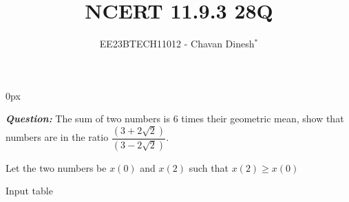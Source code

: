 \documentclass[journal,12pt,twocolumn]{IEEEtran}
\theoremstyle{remark}
\begin{document}
\parindent 0px

\vspace{3cm}

\title{NCERT 11.9.3 28Q}
\author{EE23BTECH11012 - Chavan Dinesh$^{*}$%
}
\maketitle
\newpage
\bigskip

\renewcommand{\thefigure}{\arabic{figure}}
\renewcommand{\thetable}{\arabic{table}}
\large\textbf{\textsl{Question:}}
The sum of two numbers is $6$ times their geometric mean, show that numbers are in the ratio $\dfrac{(3+2\sqrt{2})}{(3-2\sqrt{2})}$.

\solution
\fi
Let the two numbers be $x(0)$ and $x(2)$ such that $x(2)\geq x(0)$ 
\begin{table}[htbp]
    \centering
    
    \caption{Input table}
    \label{tab:parameter_table.11.9.3.28}
\end{table}
\end{document}
